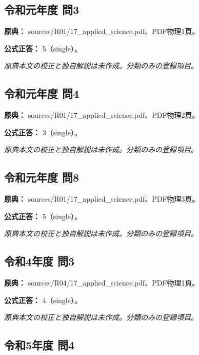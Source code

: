 \subsection{令和元年度 問3}
\label{q:r01-reg-applied-03}

\noindent\textbf{原典：} sources/R01/17\_applied\_science.pdf、PDF物理1頁。

\textbf{公式正答：} 5（single）。

\par\textit{原典本文の校正と独自解説は未作成。分類のみの登録項目。}

\subsection{令和元年度 問4}
\label{q:r01-reg-applied-04}

\noindent\textbf{原典：} sources/R01/17\_applied\_science.pdf、PDF物理2頁。

\textbf{公式正答：} 3（single）。

\par\textit{原典本文の校正と独自解説は未作成。分類のみの登録項目。}

\subsection{令和元年度 問8}
\label{q:r01-reg-applied-08}

\noindent\textbf{原典：} sources/R01/17\_applied\_science.pdf、PDF物理3頁。

\textbf{公式正答：} 5（single）。

\par\textit{原典本文の校正と独自解説は未作成。分類のみの登録項目。}

\subsection{令和4年度 問3}
\label{q:r04-reg-applied-03}

\noindent\textbf{原典：} sources/R04/17\_applied\_science.pdf、PDF物理1頁。

\textbf{公式正答：} 4（single）。

\par\textit{原典本文の校正と独自解説は未作成。分類のみの登録項目。}

\subsection{令和5年度 問4}
\label{q:r05-reg-applied-04}

